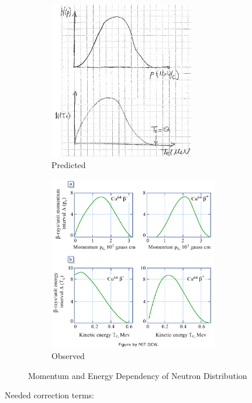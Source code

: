 \documentclass{school-22.101-notes}
\begin{document}
\begin{figure}
  \centering
  \centering
  \begin{subfigure}[b]{0.45\textwidth}
    \centering
    \includegraphics[height=2.7in]{images/rd/beta-predicted-distribution.png}
    \caption{Predicted}\label{beta-predicted}
  \end{subfigure}
  \begin{subfigure}[b]{0.45\textwidth}
    \centering
    \includegraphics[height=3in]{images/rd/beta-observed-distribution.png}
    \caption{Observed}\label{beta-observed}
  \end{subfigure}
  \caption{Momentum and Energy Dependency of Neutron Distribution}  \label{distribution}
\end{figure}
Needed correction terms: 
\end{document}
